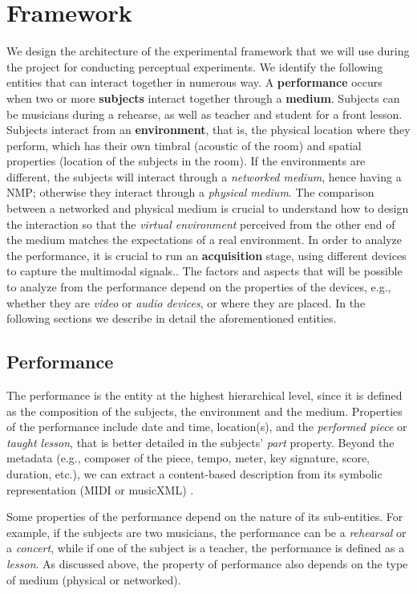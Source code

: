 \section{Framework}\label{sec:framework}
We design the architecture of the experimental framework that we will use during the project for conducting perceptual experiments. We identify the following entities that can interact together in numerous way. A \textbf{performance} occurs when two or more \textbf{subjects} interact together through a \textbf{medium}. Subjects can be musicians during a rehearse, as well as teacher and student for a front lesson. Subjects interact from an \textbf{environment}, that is, the physical location where they perform, which has their own timbral (acoustic of the room) and spatial properties (location of the subjects in the room). If the environments are different, the subjects will interact through a \textit{networked medium}, hence having a NMP; otherwise they interact through a \textit{physical medium}. The comparison between a networked and physical medium is crucial to understand how to design the interaction so that the \textit{virtual environment} perceived from the other end of the medium matches the expectations of a real environment. In order to analyze the performance, it is crucial to run an \textbf{acquisition} stage, using different devices to capture the multimodal signals.. The factors and aspects that will be possible to analyze from the performance depend on the properties of the devices, e.g., whether they are \textit{video} or \textit{audio devices}, or where they are placed. In the following sections we describe in detail the aforementioned entities.

\subsection{Performance}
The performance is the entity at the highest hierarchical level, since it is defined as the composition of the subjects, the environment and the medium. 
Properties of the performance include date and time, location(s), and the \textit{performed piece} or \textit{taught lesson}, that is better detailed in the subjects' \textit{part} property. Beyond the metadata (e.g., composer of the piece, tempo, meter, key signature, score, duration, etc.), we can extract a content-based description from its symbolic representation (MIDI or musicXML) \cite{MIDItoolbox}.

Some properties of the performance depend on the nature of its sub-entities. For example, if the subjects are two musicians, the performance can be a \textit{rehearsal} or a \textit{concert}, while if one of the subject is a teacher, the performance is defined as a \textit{lesson}. As discussed above, the property of performance also depends on the type of medium (physical or networked).  

